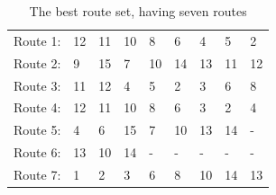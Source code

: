 \begin{table}[H]
    \centering
    \begin{tabular}{|l|l l l l l l l l|}
    \hline
    Route 1: & 12 & 11 & 10 & 8 & 6 & 4 & 5 & 2 \\
    Route 2: & 9 & 15 & 7 & 10 & 14 & 13 & 11 & 12 \\
    Route 3: & 11 & 12 & 4 & 5 & 2 & 3 & 6 & 8 \\
    Route 4: & 12 & 11 & 10 & 8 & 6 & 3 & 2 & 4 \\
    Route 5: & 4 & 6 & 15 & 7 & 10 & 13 & 14 & - \\
    Route 6: & 13 & 10 & 14 & - & - & - & - & - \\
    Route 7: & 1 & 2 & 3 & 6 & 8 & 10 & 14 & 13 \\
    \hline
    \end{tabular}
    \caption {The best route set, having seven routes }
    \label{table:performanceComparison_bestRouteSet7}
    \end{table}

